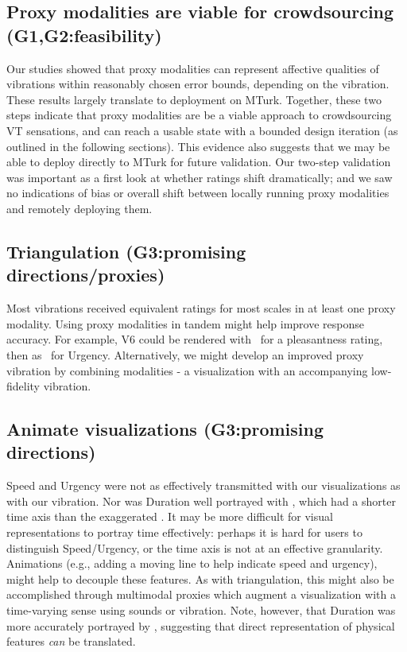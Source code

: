     \subsection{Proxy modalities are viable for crowdsourcing (G1,G2:feasibility)} %
   Our studies showed that proxy modalities can represent %
   affective qualities of vibrations within reasonably chosen error bounds, depending on the vibration.
   These results largely translate to deployment on MTurk.
   Together, these two steps indicate that proxy modalities are be a viable approach to crowdsourcing VT sensations, and can reach a usable state with a bounded design iteration (as outlined in the following sections).
   This evidence also suggests that we may be able to deploy directly to MTurk for future validation.
   Our two-step validation was important as a first look at whether ratings shift dramatically; and we saw no indications of bias or overall shift between locally running proxy modalities and remotely deploying them.
   \vspace{0.35in}
    \subsection{Triangulation (G3:promising directions/proxies)}
	Most vibrations received equivalent ratings for most scales in at least one proxy modality.
	Using proxy modalities in tandem might help improve response accuracy.
	For example, V6 could be rendered with \lofi~for a pleasantness rating, then as \linear~for Urgency.
	Alternatively, we might develop an improved proxy vibration by combining modalities - a visualization with an accompanying low-fidelity vibration.
	

    \subsection{Animate visualizations (G3:promising directions)}
    Speed and Urgency were not as effectively transmitted with our visualizations as with our vibration.
    Nor was Duration well portrayed with  \original, which had a shorter time axis than the exaggerated \linear.
    It may be more difficult for visual representations to portray time effectively: perhaps it is hard for users to distinguish Speed/Urgency, or the time axis is not at an effective granularity.
    Animations (e.g., adding a moving line to help indicate speed and urgency), might help to decouple these features.
    As with triangulation, this might also be accomplished through multimodal proxies which augment a visualization with a time-varying sense using sounds or vibration.
    Note, however, that Duration was more accurately portrayed by \linear, suggesting that direct representation of physical features \textit{can} be translated.
    
